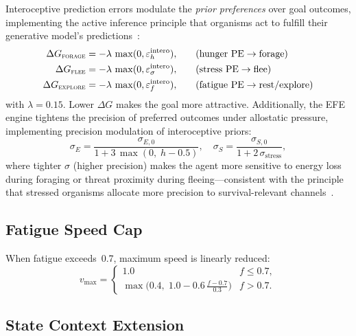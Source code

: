 \documentclass[11pt,a4paper]{article}
\begin{document}
Interoceptive prediction errors modulate the \emph{prior preferences}
over goal outcomes, implementing the active inference principle that
organisms act to fulfill their generative model's
predictions~\cite{friston2010,pezzulo2015}:
\begin{equation}\label{eq:allo_bias}
\begin{aligned}
  \Delta G_\textsc{forage}  &= -\lambda\,\max(0, \varepsilon_h^\text{intero}), &\quad &\text{(hunger PE} \to \text{forage)} \\
  \Delta G_\textsc{flee}    &= -\lambda\,\max(0, \varepsilon_\sigma^\text{intero}), &\quad &\text{(stress PE} \to \text{flee)} \\
  \Delta G_\textsc{explore} &= -\lambda\,\max(0, \varepsilon_f^\text{intero}), &\quad &\text{(fatigue PE} \to \text{rest/explore)}
\end{aligned}
\end{equation}
with $\lambda = 0.15$.
Lower $\Delta G$ makes the goal more attractive.
Additionally, the EFE engine tightens the precision of preferred outcomes
under allostatic pressure, implementing precision modulation
of interoceptive priors:
\begin{equation}\label{eq:allo_precision}
  \sigma_E = \frac{\sigma_{E,0}}{1 + 3\,\max(0,\; h - 0.5)},
  \quad
  \sigma_S = \frac{\sigma_{S,0}}{1 + 2\,\sigma_\text{stress}},
\end{equation}
where tighter $\sigma$ (higher precision) makes the agent more sensitive
to energy loss during foraging or threat proximity during
fleeing---consistent with the principle that stressed organisms
allocate more precision to survival-relevant
channels~\cite{stephan2016}.

\subsection{Fatigue Speed Cap}

When fatigue exceeds~0.7, maximum speed is linearly reduced:
\begin{equation}\label{eq:speed_cap}
  v_\text{max} = \begin{cases}
    1.0 & f \leq 0.7, \\
    \max\!\bigl(0.4,\; 1.0 - 0.6\,\frac{f - 0.7}{0.3}\bigr) & f > 0.7.
  \end{cases}
\end{equation}

\subsection{State Context Extension}
\end{document}
